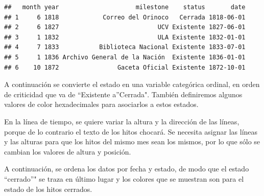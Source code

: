 \documentclass[]{article}
\newenvironment{Shaded}{\begin{snugshade}}{\end{snugshade}}
\newcommand{\DataTypeTok}[1]{\textcolor[rgb]{0.13,0.29,0.53}{#1}}
\newcommand{\KeywordTok}[1]{\textcolor[rgb]{0.13,0.29,0.53}{\textbf{#1}}}
\newcommand{\NormalTok}[1]{#1}
\newcommand{\OperatorTok}[1]{\textcolor[rgb]{0.81,0.36,0.00}{\textbf{#1}}}
\newcommand{\OtherTok}[1]{\textcolor[rgb]{0.56,0.35,0.01}{#1}}
\newcommand{\StringTok}[1]{\textcolor[rgb]{0.31,0.60,0.02}{#1}}
\begin{document}
\begin{verbatim}
##   month year                     milestone    status       date
## 1     6 1818            Correo del Orinoco   Cerrada 1818-06-01
## 2     6 1827                           UCV Existente 1827-06-01
## 3     1 1832                           ULA Existente 1832-01-01
## 4     7 1833           Biblioteca Nacional Existente 1833-07-01
## 5     1 1836 Archivo General de la Nación  Existente 1836-01-01
## 6    10 1872                Gaceta Oficial Existente 1872-10-01
\end{verbatim}

A continuación se convierte el estado en una variable categórica
ordinal, en orden de criticidad que va de ``Existente a''Cerrada".
También definiremos algunos valores de color hexadecimales para
asociarlos a estos estados.

\begin{Shaded}
\end{Shaded}

En la línea de tiempo, se quiere variar la altura y la dirección de las
líneas, porque de lo contrario el texto de los hitos chocará. Se
necesita asignar las líneas y las alturas para que los hitos del mismo
mes sean los mismos, por lo que sólo se cambian los valores de altura y
posición.

A continuación, se ordena los datos por fecha y estado, de modo que el
estado ``cerrado''" se traza en último lugar y los colores que se
muestran son para el estado de los hitos cerrados.
\end{document}
